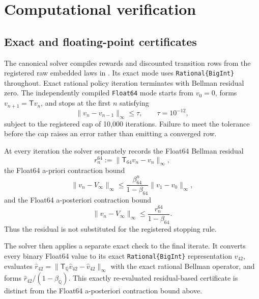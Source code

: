 \section{Computational verification}\label{app:numerical-convergence}

\subsection{Exact and floating-point certificates}
\label{app:residual-bounds}

The canonical solver compiles rewards and discounted transition rows from the
registered raw embedded laws in
.  Its exact mode
uses \texttt{Rational\{BigInt\}} throughout.  Exact rational policy iteration
terminates with Bellman residual zero.  The independently compiled
\texttt{Float64} mode starts from \(v_0=0\), forms
\(v_{n+1}=\mathsf T v_n\), and stops at the first \(n\) satisfying
\begin{equation}\label{eq:numerical-stopping-rule}
  \lVert v_n-v_{n-1}\rVert_\infty\le \tau,
  \qquad \tau=10^{-12},
\end{equation}
subject to the registered cap of 10,000 iterations.  Failure to meet the
tolerance before the cap raises an error rather than emitting a converged
row.

At every iteration the solver separately records the Float64 Bellman residual
\begin{equation}\label{eq:numerical-bellman-residual}
  r_n^{64}:=\lVert\mathsf T_{64} v_n-v_n\rVert_\infty,
\end{equation}
the Float64 a-priori contraction bound
\begin{equation}\label{eq:numerical-apriori-bound}
  \lVert v_n-V_\infty\rVert_\infty
  \le \frac{\beta_{64}^n}{1-\beta_{64}}
       \lVert v_1-v_0\rVert_\infty,
\end{equation}
and the Float64 a-posteriori contraction bound
\begin{equation}\label{eq:numerical-posterior-bound}
  \lVert v_n-V_\infty\rVert_\infty
  \le \frac{r_n^{64}}{1-\beta_{64}}.
\end{equation}
Thus the residual is not substituted for the registered stopping rule.

The solver then applies a separate exact check to the final iterate.  It
converts every binary Float64 value to its exact
\texttt{Rational\{BigInt\}} representation \(\widehat v_{42}\), evaluates
\(\widehat r_{42}=\lVert\mathsf T_{\mathbb Q}\widehat v_{42}-
\widehat v_{42}\rVert_\infty\) with the exact rational Bellman operator, and
forms \(\widehat r_{42}/(1-\beta_{\mathbb Q})\).  This exactly re-evaluated
residual-based certificate is distinct from the Float64 a-posteriori
contraction bound above.

